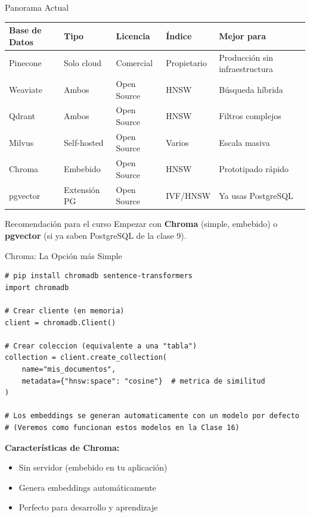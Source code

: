 \documentclass[aspectratio=169]{beamer}
\begin{document}
\begin{frame}{Panorama Actual}
    \begin{table}[]
        \centering
        \renewcommand{\arraystretch}{1.3}
        \scriptsize
        \begin{tabular}{p{2.2cm} p{2cm} p{2cm} p{2.2cm} p{3.5cm}}
            \toprule
            \textbf{Base de Datos} & \textbf{Tipo} & \textbf{Licencia} & \textbf{Índice} & \textbf{Mejor para} \\
            \midrule
            Pinecone & Solo cloud & Comercial & Propietario & Producción sin infraestructura \\
            Weaviate & Ambos & Open Source & HNSW & Búsqueda híbrida \\
            Qdrant & Ambos & Open Source & HNSW & Filtros complejos \\
            Milvus & Self-hosted & Open Source & Varios & Escala masiva \\
            Chroma & Embebido & Open Source & HNSW & Prototipado rápido \\
            pgvector & Extensión PG & Open Source & IVF/HNSW & Ya usas PostgreSQL \\
            \bottomrule
        \end{tabular}
    \end{table}
    
    \vspace{0.2cm}
    \begin{alertblock}{Recomendación para el curso}
        Empezar con \textbf{Chroma} (simple, embebido) o \textbf{pgvector} (si ya saben PostgreSQL de la clase 9).
    \end{alertblock}
\end{frame}

\begin{frame}[fragile]{Chroma: La Opción más Simple}
\begin{lstlisting}[style=pythonstyle]
# pip install chromadb sentence-transformers
import chromadb

# Crear cliente (en memoria)
client = chromadb.Client()

# Crear coleccion (equivalente a una "tabla")
collection = client.create_collection(
    name="mis_documentos",
    metadata={"hnsw:space": "cosine"}  # metrica de similitud
)

# Los embeddings se generan automaticamente con un modelo por defecto
# (Veremos como funcionan estos modelos en la Clase 16)
\end{lstlisting}

\vspace{0.2cm}
\textbf{Características de Chroma:}
\begin{itemize}
    \item Sin servidor (embebido en tu aplicación)
    \item Genera embeddings automáticamente
    \item Perfecto para desarrollo y aprendizaje
\end{itemize}
\end{frame}
\end{document}
